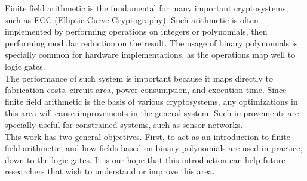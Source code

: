 

Finite field arithmetic is the fundamental for many important cryptosystems, such as ECC (Elliptic Curve Cryptography). Such arithmetic is often implemented by performing operations on integers or polynomials, then performing modular reduction on the result. The usage of binary polynomials is specially common for hardware implementations, as the operations map well to logic gates. \\

The performance of such system is important because it maps directly to fabrication costs, circuit area, power consumption, and execution time. Since finite field arithmetic is the basis of various cryptosystems, any optimizations in this area will cause improvements in the general system. Such improvements are specially useful for constrained systems, such as sensor networks. \\

This work has two general objectives. First, to act as an introduction to finite field arithmetic, and how fields based on binary polynomials are used in practice, down to the logic gates. It is our hope that this introduction can help future researchers that wish to understand or improve this area. \\

